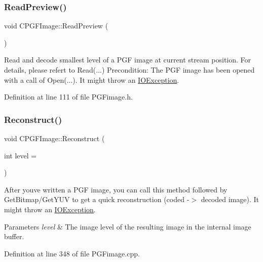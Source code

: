\subsubsection{\texorpdfstring{ReadPreview()}{ReadPreview()}}
{\footnotesize\ttfamily void C\+P\+G\+F\+Image\+::\+Read\+Preview (\begin{DoxyParamCaption}{ }\end{DoxyParamCaption})\hspace{0.3cm}{\ttfamily [inline]}}

Read and decode smallest level of a P\+GF image at current stream position. For details, please refert to Read(...) Precondition\+: The P\+GF image has been opened with a call of Open(...). It might throw an \mbox{\hyperlink{structIOException}{I\+O\+Exception}}. 

Definition at line 111 of file P\+G\+Fimage.\+h.


\begin{DoxyCode}{0}

\end{DoxyCode}
\mbox{\label{classCPGFImage_abf906b469e11800e819db00009255b90}} 
\subsubsection{\texorpdfstring{Reconstruct()}{Reconstruct()}}
{\footnotesize\ttfamily void C\+P\+G\+F\+Image\+::\+Reconstruct (\begin{DoxyParamCaption}\item[{int}]{level = {} }\end{DoxyParamCaption})}

After you\textquotesingle{}ve written a P\+GF image, you can call this method followed by Get\+Bitmap/\+Get\+Y\+UV to get a quick reconstruction (coded -\/$>$ decoded image). It might throw an \mbox{\hyperlink{structIOException}{I\+O\+Exception}}. 
\begin{DoxyParams}{Parameters}
{\em level} & The image level of the resulting image in the internal image buffer. \\
\hline
\end{DoxyParams}


Definition at line 348 of file P\+G\+Fimage.\+cpp.


